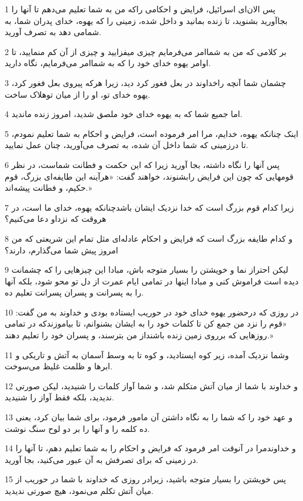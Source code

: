 \par 1 پس الان‌ای اسرائیل، فرایض و احکامی راکه من به شما تعلیم می‌دهم تا آنها را بجاآورید بشنوید، تا زنده بمانید و داخل شده، زمینی را که یهوه، خدای پدران شما، به شمامی دهد به تصرف آورید.
\par 2 بر کلامی که من به شماامر می‌فرمایم چیزی میفزایید و چیزی از آن کم منمایید، تا اوامر یهوه خدای خود را که به شماامر می‌فرمایم، نگاه دارید.
\par 3 چشمان شما آنچه راخداوند در بعل فغور کرد دید، زیرا هرکه پیروی بعل فغور کرد، یهوه خدای تو، او را از میان توهلاک ساخت.
\par 4 اما جمیع شما که به یهوه خدای خود ملصق شدید، امروز زنده ماندید.
\par 5 اینک چنانکه یهوه، خدایم، مرا امر فرموده است، فرایض و احکام به شما تعلیم نمودم، تا درزمینی که شما داخل آن شده، به تصرف می‌آورید، چنان عمل نمایید.
\par 6 پس آنها را نگاه داشته، بجا آورید زیرا که این حکمت و فطانت شماست، در نظر قومهایی که چون این فرایض رابشنوند، خواهند گفت: «هرآینه این طایفه‌ای بزرگ، قوم حکیم، و فطانت پیشه‌اند.»
\par 7 زیرا کدام قوم بزرگ است که خدا نزدیک ایشان باشدچنانکه یهوه، خدای ما است، در هروقت که نزداو دعا می‌کنیم؟
\par 8 و کدام طایفه بزرگ است که فرایض و احکام عادله‌ای مثل تمام این شریعتی که من امروز پیش شما می‌گذارم، دارند؟
\par 9 لیکن احتراز نما و خویشتن را بسیار متوجه باش، مبادا این چیزهایی را که چشمانت دیده است فراموش کنی و مبادا اینها در تمامی ایام عمرت از دل تو محو شود، بلکه آنها را به پسرانت و پسران پسرانت تعلیم ده.
\par 10 در روزی که درحضور یهوه خدای خود در حوریب ایستاده بودی و خداوند به من گفت: «قوم را نزد من جمع کن تا کلمات خود را به ایشان بشنوانم، تا بیاموزندکه در تمامی روزهایی که برروی زمین زنده باشنداز من بترسند، و پسران خود را تعلیم دهند.»
\par 11 وشما نزدیک آمده، زیر کوه ایستادید، و کوه تا به وسط آسمان به آتش و تاریکی و ابرها و ظلمت غلیظ می‌سوخت.
\par 12 و خداوند با شما از میان آتش متکلم شد، و شما آواز کلمات را شنیدید، لیکن صورتی ندیدید، بلکه فقط آواز را شنیدید.
\par 13 و عهد خود را که شما را به نگاه داشتن آن مامور فرمود، برای شما بیان کرد، یعنی ده کلمه را و آنها را بر دو لوح سنگ نوشت.
\par 14 و خداوندمرا در آنوقت امر فرمود که فرایض و احکام را به شما تعلیم دهم، تا آنها را در زمینی که برای تصرفش به آن عبور می‌کنید، بجا آورید.
\par 15 پس خویشتن را بسیار متوجه باشید، زیرادر روزی که خداوند با شما در حوریب از میان آتش تکلم می‌نمود، هیچ صورتی ندیدید.
